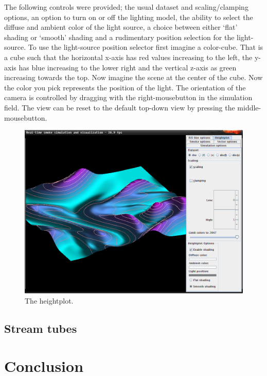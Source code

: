 \documentclass[a4paper,11pt,twoside]{report}
\begin{document}
		The following controls were provided; the usual dataset and scaling/clamping options, an option to turn on or off the lighting model, the ability to select the diffuse and ambient color of the light source, a choice between either `flat' shading or `smooth' shading and a rudimentary position selection for the light-source. To use the light-source position selector first imagine a color-cube. That is a cube such that the horizontal x-axis has red values increasing to the left, the y-axis has blue increasing to the lower right and the vertical z-axis as green increasing towards the top. Now imagine the scene at the center of the cube. Now the color you pick represents the position of the light.
		The orientation of the camera is controlled by dragging with the right-mousebutton in the simulation field. The view can be reset to the default top-down view by pressing the middle-mousebutton.
		\begin{figure}[h]
		\centering
		\includegraphics[scale=\imagescalefactor]{images/step6.png}
		\caption{The heightplot.}\label{fig:step6}
		\end{figure}
		\clearpage
	\section{Stream tubes}
\chapter{Conclusion}
\end{document}
